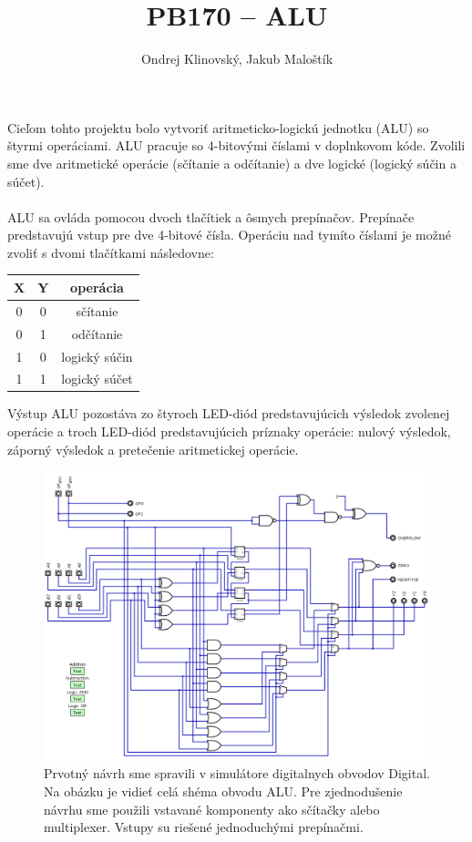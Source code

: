 \documentclass{article}
\title{PB170 -- ALU}
\author{Ondrej Klinovský, Jakub Maloštík}
\begin{document}
    \maketitle

    \paragraph{}
    Cieľom tohto projektu bolo vytvoriť aritmeticko-logickú jednotku (ALU) so štyrmi operáciami. ALU pracuje so 4-bitovými číslami v doplnkovom kóde. Zvolili sme dve aritmetické operácie (sčítanie a odčítanie) a dve logické (logický súčin a súčet).
    \paragraph{}
    ALU sa ovláda pomocou dvoch tlačítiek a ôsmych prepínačov. Prepínače predstavujú vstup pre dve 4-bitové čísla. Operáciu nad tymíto číslami je možné zvoliť s dvomi tlačítkami následovne:
    \begin{center}
    \begin{tabular}{| c | c | c |}
        \hline
        X & Y & operácia \\
        \hline
        0 & 0 & sčítanie \\
        0 & 1 & odčítanie \\
        1 & 0 & logický súčin \\
        1 & 1 & logický súčet \\
        \hline
    \end{tabular}
    \end{center}
    Výstup ALU pozostáva zo štyroch LED-diód predstavujúcich výsledok zvolenej operácie a troch LED-diód predstavujúcich príznaky operácie: nulový výsledok, záporný výsledok a pretečenie aritmetickej operácie.

    \begin{figure}[h!]
        \centering
        \includegraphics[width=.8\linewidth]{sim.png}
        \caption{Prvotný návrh sme spravili v simulátore digitalnych obvodov Digital. Na obázku je vidieť celá shéma obvodu ALU. Pre zjednodušenie návrhu sme použili vstavané komponenty ako sčítačky alebo multiplexer. Vstupy su riešené jednoduchými prepínačmi.}
    \end{figure}
\end{document}
